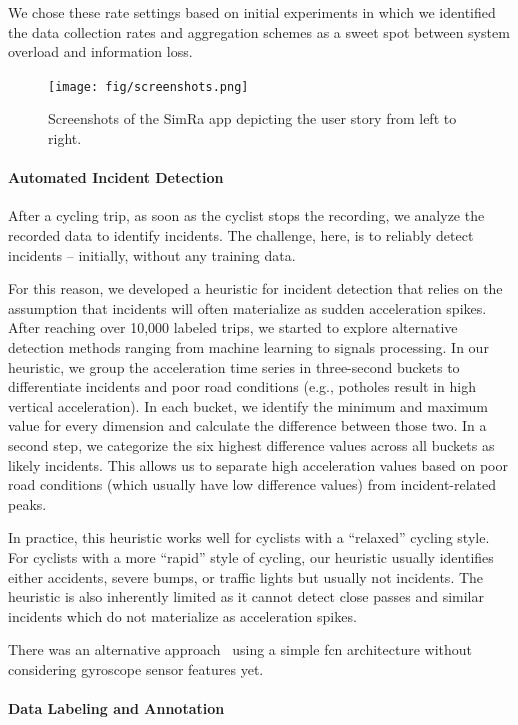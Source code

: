 We chose these rate settings based on initial experiments in which we identified the data collection rates and aggregation schemes as a sweet spot between system overload and information loss.


\begin{figure}%
	\centering
	\texttt{[image: fig/screenshots.png]}
	\caption{Screenshots of the SimRa app depicting the user story from left to right.}
	\label{fig:user-story}
\end{figure}

\paragraph{Automated Incident Detection}
After a cycling trip, as soon as the cyclist stops the recording, we analyze the recorded data to identify incidents.
The challenge, here, is to reliably detect incidents -- initially, without any training data.

For this reason, we developed a heuristic for incident detection that relies on the assumption that incidents will often materialize as sudden acceleration spikes.
After reaching over 10,000 labeled trips, we started to explore alternative detection methods ranging from machine learning to signals processing.
In our heuristic, we group the acceleration time series in three-second buckets to differentiate incidents and poor road conditions (e.g., potholes result in high vertical acceleration).
In each bucket, we identify the minimum and maximum value for every dimension and calculate the difference between those two.
In a second step, we categorize the six highest difference values across all buckets as likely incidents.
This allows us to separate high acceleration values based on poor road conditions (which usually have low difference values) from incident-related peaks.

In practice, this heuristic works well for cyclists with a ``relaxed'' cycling style.
For cyclists with a more ``rapid'' style of cycling, our heuristic usually identifies either accidents, severe bumps, or traffic lights but usually not incidents.
The heuristic is also inherently limited as it cannot detect close passes and similar incidents which do not materialize as acceleration spikes.

There was an alternative approach~\cite{sanchez2020detecting} using a simple \ac{fcn} architecture without considering gyroscope sensor features yet.

\paragraph{Data Labeling and Annotation}


